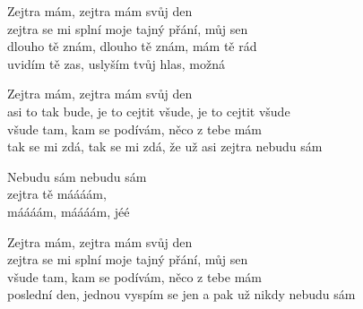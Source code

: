 
\ve{}
Zejtra mám, zejtra mám svůj den \hspace{1em} \\
zejtra se mi splní moje tajný přání, můj sen \hspace{1em} \\
dlouho tě znám, dlouho tě znám, mám tě rád \hspace{1em} \\
uvidím tě zas, uslyším tvůj hlas, možná \hspace{1em} 

\ve{}
Zejtra mám, zejtra mám svůj den\\
asi to tak bude, je to cejtit všude, je to cejtit všude\\
všude tam, kam se podívám, něco z tebe mám\\
tak se mi zdá, tak se mi zdá, že už asi zejtra nebudu sám

\cho{}
Nebudu sám nebudu sám\\
zejtra tě máááám,\\
máááám, máááám, jéé

\ve{}
Zejtra mám, zejtra mám svůj den\\
zejtra se mi splní moje tajný přání, můj sen\\
všude tam, kam se podívám, něco z tebe mám\\
poslední den, jednou vyspím se jen a pak už nikdy nebudu sám

\cho{}

\cho{}

\esong